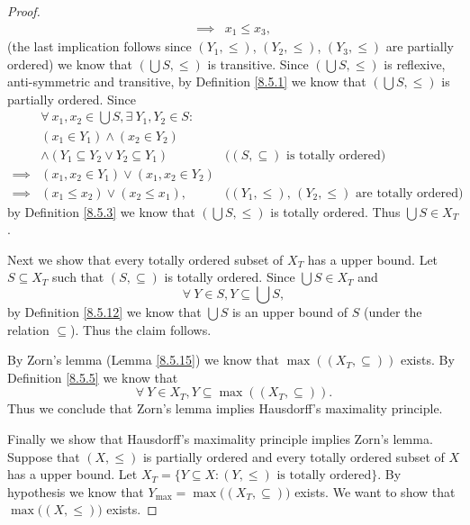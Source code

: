 \begin{proof}
\begin{align*}
        \implies & x_1 \leq x_3,
    \end{align*}
    (the last implication follows since \((Y_1, \leq)\), \((Y_2, \leq)\), \((Y_3, \leq)\) are partially ordered)
    we know that \((\bigcup S, \leq)\) is transitive.
    Since \((\bigcup S, \leq)\) is reflexive, anti-symmetric and transitive, by Definition \ref{8.5.1} we know that \((\bigcup S, \leq)\) is partially ordered.
    Since
    \begin{align*}
        & \forall\ x_1, x_2 \in \bigcup S, \exists\ Y_1, Y_2 \in S : \\
        & (x_1 \in Y_1) \land (x_2 \in Y_2) \\
        & \land (Y_1 \subseteq Y_2 \lor Y_2 \subseteq Y_1) & \text{(\((S, \subseteq)\) is totally ordered)} \\
        \implies & (x_1, x_2 \in Y_1) \lor (x_1, x_2 \in Y_2) \\
        \implies & (x_1 \leq x_2) \lor (x_2 \leq x_1), & \text{(\((Y_1, \leq)\), \((Y_2, \leq)\) are totally ordered)}
    \end{align*}
    by Definition \ref{8.5.3} we know that \((\bigcup S, \leq)\) is totally ordered.
    Thus \(\bigcup S \in X_T\).

    Next we show that every totally ordered subset of \(X_T\) has a upper bound.
    Let \(S \subseteq X_T\) such that \((S, \subseteq)\) is totally ordered.
    Since \(\bigcup S \in X_T\) and
    \[
        \forall\ Y \in S, Y \subseteq \bigcup S,
    \]
    by Definition \ref{8.5.12} we know that \(\bigcup S\) is an upper bound of \(S\) (under the relation \(\subseteq\)).
    Thus the claim follows.

    By Zorn's lemma (Lemma \ref{8.5.15}) we know that \(\max((X_T, \subseteq))\) exists.
    By Definition \ref{8.5.5} we know that
    \[
        \forall\ Y \in X_T, Y \subseteq \max((X_T, \subseteq)).
    \]
    Thus we conclude that Zorn's lemma implies Hausdorff's maximality principle.

    Finally we show that Hausdorff's maximality principle implies Zorn's lemma.
    Suppose that \((X, \leq)\) is partially ordered and every totally ordered subset of \(X\) has a upper bound.
    Let \(X_T = \{Y \subseteq X : (Y, \leq) \text{ is totally ordered}\}\).
    By hypothesis we know that \(Y_{\max} = \max\big((X_T, \subseteq)\big)\) exists.
    We want to show that \(\max\big((X, \leq)\big)\) exists.


\end{proof}
